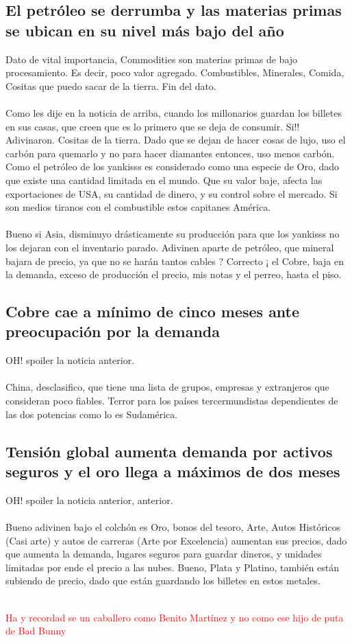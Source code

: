 \subsection{El petróleo se derrumba y las materias primas se ubican en su nivel más bajo del año}
Dato de vital importancia, Commodities son materias primas de bajo procesamiento. Es decir, poco valor agregado. Combustibles, Minerales, Comida, Cositas que puedo sacar de la tierra. Fin del dato. 
\\
\\
Como les dije en la noticia de arriba, cuando los millonarios guardan los billetes en sus casas, que creen que es lo primero que se deja de consumir. Si!! Adivinaron. Cositas de la tierra. Dado que se dejan de hacer cosas de lujo, uso el carbón para quemarlo y no para hacer diamantes entonces, uso menos carbón.  Como el petróleo de los yankisss es considerado como una especie de Oro, dado que existe una cantidad limitada en el mundo. Que su valor baje, afecta las exportaciones de USA, su cantidad de dinero, y su control sobre el mercado. Si son medios tiranos con el combustible estos capitanes América.
\\
\\
Bueno si Asia, disminuyo drásticamente su producción para que los yankisss no los dejaran con el inventario parado. Adivinen aparte de petróleo, que mineral bajara de precio, ya que no se harán tantos cables ?  Correcto ¡ el Cobre, baja en la demanda, exceso de producción el precio, mis notas y el perreo, hasta el piso.  
\subsection{Cobre cae a mínimo de cinco meses ante preocupación por la demanda}

OH! spoiler la noticia anterior. 
\\
\\
China, desclasifico, que tiene una lista de grupos, empresas y extranjeros que consideran poco fiables. Terror para los países tercermundistas dependientes de las dos potencias como lo es Sudamérica. 
\subsection{Tensión global aumenta demanda por activos seguros y el oro llega a máximos de dos meses}

OH! spoiler la noticia anterior, anterior. 
\\
\\
Bueno adivinen bajo el colchón es Oro, bonos del tesoro, Arte, Autos Históricos (Casi arte) y autos de carreras (Arte por Excelencia) aumentan sus precios, dado que aumenta la demanda, lugares seguros para guardar dineros, y unidades limitadas por ende el precio a las nubes.  Bueno, Plata y Platino, también están subiendo de precio, dado que están guardando los billetes en estos metales. 

\subitem
\centering
\\
\textcolor{Red}{Ha y recordad se un caballero como Benito Martínez y no como ese hijo de puta de Bad Bunny}


